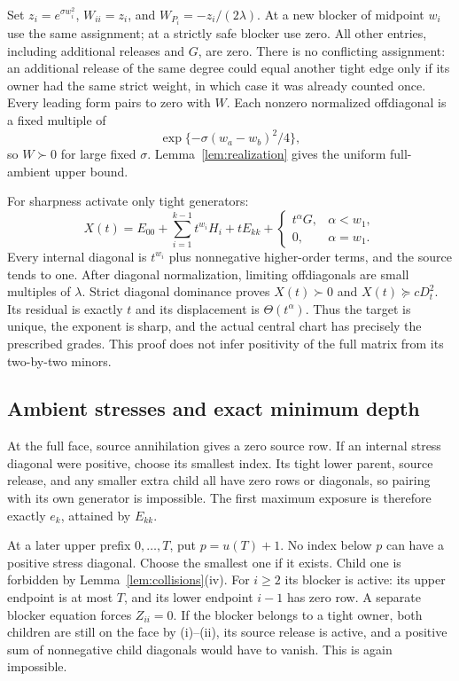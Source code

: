 Set $z_i=e^{\sigma w_i^2}$, $W_{ii}=z_i$, and $W_{P_i}=-z_i/(2\lambda)$. At a new blocker of midpoint $w_i$ use the same assignment; at a strictly safe blocker use zero. All other entries, including additional releases and $G$, are zero. There is no conflicting assignment: an additional release of the same degree could equal another tight edge only if its owner had the same strict weight, in which case it was already counted once. Every leading form pairs to zero with $W$. Each nonzero normalized offdiagonal is a fixed multiple of
\[
 \exp\{-\sigma(w_a-w_b)^2/4\},
\]
so $W\succ0$ for large fixed $\sigma$. Lemma~\ref{lem:realization} gives the uniform full-ambient upper bound.

For sharpness activate only tight generators:
\begin{equation}\label{eq:real-arc}
 X(t)=E_{00}+\sum_{i=1}^{k-1}t^{w_i}H_i+tE_{kk}
       +\begin{cases}t^\alpha G,&\alpha<w_1,\\0,&\alpha=w_1.\end{cases}
\end{equation}
Every internal diagonal is $t^{w_i}$ plus nonnegative higher-order terms, and the source tends to one. After diagonal normalization, limiting offdiagonals are small multiples of $\lambda$. Strict diagonal dominance proves $X(t)\succ0$ and $X(t)\succeq cD_t^2$. Its residual is exactly $t$ and its displacement is $\Theta(t^\alpha)$. Thus the target is unique, the exponent is sharp, and the actual central chart has precisely the prescribed grades. This proof does not infer positivity of the full matrix from its two-by-two minors.

\subsection{Ambient stresses and exact minimum depth}
At the full face, source annihilation gives a zero source row. If an internal stress diagonal were positive, choose its smallest index. Its tight lower parent, source release, and any smaller extra child all have zero rows or diagonals, so pairing with its own generator is impossible. The first maximum exposure is therefore exactly $e_k$, attained by $E_{kk}$.

At a later upper prefix $0,\ldots,T$, put $p=u(T)+1$. No index below $p$ can have a positive stress diagonal. Choose the smallest one if it exists. Child one is forbidden by Lemma~\ref{lem:collisions}(iv). For $i\ge2$ its blocker is active: its upper endpoint is at most $T$, and its lower endpoint $i-1$ has zero row. A separate blocker equation forces $Z_{ii}=0$. If the blocker belongs to a tight owner, both children are still on the face by (i)--(ii), its source release is active, and a positive sum of nonnegative child diagonals would have to vanish. This is again impossible.

